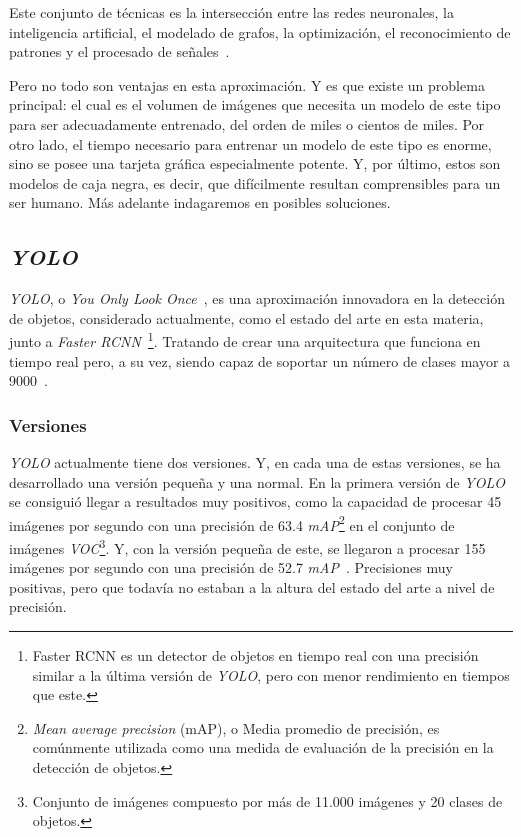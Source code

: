 Este conjunto de técnicas es la intersección entre las redes neuronales, la inteligencia artificial, el modelado de grafos, la optimización, el reconocimiento de patrones y el procesado de señales~\cite{ms:deeplearning}. %

Pero no todo son ventajas en esta aproximación. Y es que existe un problema principal: el cual es el volumen de imágenes que necesita un modelo de este tipo para ser adecuadamente entrenado, del orden de miles o cientos de miles. Por otro lado, el tiempo necesario para entrenar un modelo de este tipo es enorme, sino se posee una tarjeta gráfica especialmente potente. Y, por último, estos son modelos de caja negra, es decir, que difícilmente resultan comprensibles para un ser humano. Más adelante indagaremos en posibles soluciones.

\subsection{\textit{YOLO}}

\textit{YOLO}, o \textit{You Only Look Once}~\cite{yolo}, es una aproximación innovadora en la detección de objetos, considerado actualmente, como el estado del arte en esta materia, junto a \textit{Faster RCNN}~\cite{faster-rcnn}\footnote{Faster RCNN es un detector de objetos en tiempo real con una precisión similar a la última versión de \textit{YOLO}, pero con menor rendimiento en tiempos que este.}. Tratando de crear una arquitectura que funciona en tiempo real pero, a su vez, siendo capaz de soportar un número de clases mayor a 9000~\cite{yolov2}.

\subsubsection{Versiones}

\textit{YOLO} actualmente tiene dos versiones. Y, en cada una de estas versiones, se ha desarrollado una versión pequeña y una normal. En la primera versión de \textit{YOLO} se consiguió llegar a resultados muy positivos, como la capacidad de procesar 45 imágenes por segundo con una precisión de 63.4 \textit{mAP}\footnote{\textit{Mean average precision} (mAP), o Media promedio de precisión, es comúnmente utilizada como una medida de evaluación de la precisión en la detección de objetos.} en el conjunto de imágenes \textit{VOC}\footnote{Conjunto de imágenes compuesto por más de 11.000 imágenes y 20 clases de objetos.}. Y, con la versión pequeña de este, se llegaron a procesar 155 imágenes por segundo con una precisión de 52.7 \textit{mAP}~\cite{yolo}. Precisiones muy positivas, pero que todavía no estaban a la altura del estado del arte a nivel de precisión.

